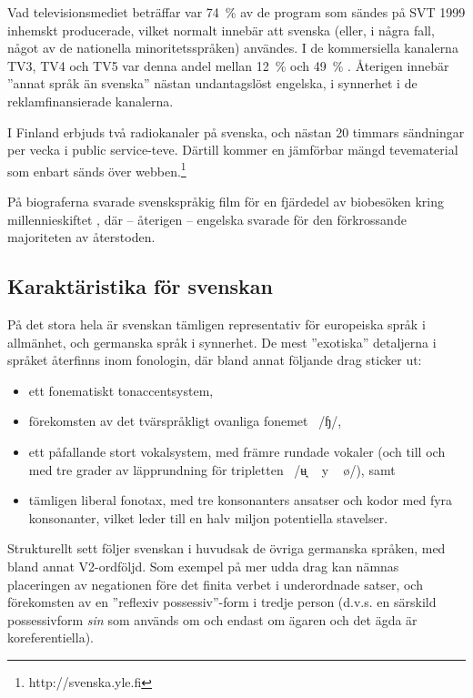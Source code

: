 \begin{multicols}{2}
Vad televisionsmediet beträffar var 74~\% av de program som sändes på
SVT 1999 inhemskt producerade, vilket normalt innebär att svenska
(eller, i några fall, något av de nationella minoritetsspråken)
användes. I de kommersiella kanalerna TV3, TV4 och TV5 var denna andel
mellan 12~\% och 49~\% \cite[79]{falk2001}. Återigen innebär ''annat språk
än svenska'' nästan undantagslöst engelska, i synnerhet i de
reklamfinansierade kanalerna.

I Finland erbjuds två radiokanaler på svenska, och nästan 20 timmars
sändningar per vecka i public service-teve. Därtill kommer en
jämförbar mängd tevematerial som enbart sänds över
webben.\footnote{http://svenska.yle.fi }

På biograferna svarade svenskspråkig film för en fjärdedel av
biobesöken kring millennieskiftet \cite[85]{falk2001}, där -- återigen
-- engelska svarade för den förkrossande majoriteten av återstoden.


\subsection{Karaktäristika för svenskan}

På det stora hela är svenskan tämligen representativ för europeiska
språk i allmänhet, och germanska språk i synnerhet. De mest ''exotiska''
detaljerna i språket återfinns inom fonologin, där bland annat
följande drag sticker ut:

\begin{itemize}
\item ett fonematiskt tonaccentsystem,
\item förekomsten av det tvärspråkligt ovanliga
  fonemet~{ /ɧ/},
\item ett påfallande stort vokalsystem, med främre rundade vokaler
  (och till och med tre grader av läpprundning för
  tripletten~{ /ʉ̘ ~ y
    ~ ø/}), samt
\item tämligen liberal fonotax, med tre konsonanters ansatser och
  kodor med fyra konsonanter, vilket leder till en halv miljon
  potentiella stavelser.
\end{itemize}

Strukturellt sett följer svenskan i huvudsak de övriga germanska
språken, med bland annat V2-ordföljd. Som exempel på mer udda drag kan
nämnas placeringen av negationen före det finita verbet i underordnade
satser, och förekomsten av en ''reflexiv possessiv''-form i tredje
person (d.v.s. en särskild possessivform \textit{sin} som används om
och endast om ägaren och det ägda är koreferentiella).


\end{multicols}
